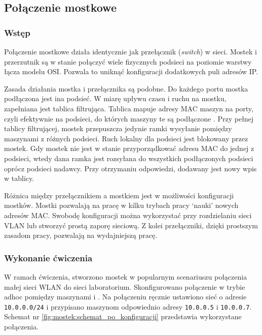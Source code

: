 \subsection{Połączenie mostkowe}


\subsubsection{Wstęp}

Połączenie mostkowe działa identycznie jak przełącznik (\emph{switch}) w sieci.
Mostek i przerzutnik są w stanie połączyć wiele fizycznych podsieci na poziomie
warstwy łącza modelu OSI. Pozwala to uniknąć konfiguracji dodatkowych puli
adresów IP.

Zasada działania mostka i przełącznika są podobne. Do każdego portu mostka
podłączona jest ina podsieć. W miarę upływu czasu i ruchu na mostku, zapełniana
jest tablica filtrująca. Tablica mapuje adresy MAC maszyn na porty, czyli
efektywnie na podsieci, do których maszyny te są podłączone
\cite{mostek:stevens-wstep}. Przy pełnej tablicy filtrującej, mostek przepuszcza
jedynie ramki wysyłanie pomiędzy maszynami z różnych podsieci. Ruch lokalny dla
podsieci jest blokowany przez mostek. Gdy mostek nie jest w stanie
przyporządkować adresu MAC do jednej z podsieci, wtedy dana ramka jest rozsyłana
do wszystkich podłączonych podsieci oprócz podsieci nadawcy. Przy otrzymaniu
odpowiedzi, dodawany jest nowy wpis w tablicy.

Różnica między przełącznikiem a mostkiem jest w możliwości konfiguracji mostków.
Mostki pozwalają na pracę w kilku trybach pracy `nauki' nowych adresów MAC.
Swobodę konfiguracji można wykorzystać przy rozdzielaniu sieci VLAN lub stworzyć
prostą zaporę sieciową. Z kolei przełączniki, dzięki prostszym zasadom pracy,
pozwalają na wydajniejszą pracę.


\subsubsection{Wykonanie ćwiczenia}

W ramach ćwiczenia, stworzono mostek w popularnym scenariuszu połączenia małej
sieci WLAN do sieci laboratorium. Skonfigurowano połączenie \wifi{} w trybie
ad\dywiz hoc pomiędzy maszynami \kp{} i \ks. Na połączeniu ręcznie ustawiono
sieć o adresie \texttt{10.0.0.0/24} i przypisano maszynom odpowiednio adresy
\texttt{10.0.0.5} i \texttt{10.0.0.7}. Schemat nr
\ref{fig:mostek:schemat_po_konfiguracji} przedstawia wykorzystane połączenia.

